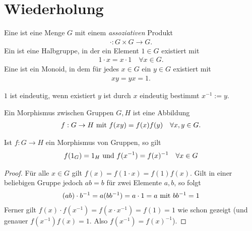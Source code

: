 \section{Wiederholung}
\begin{definition}
	Eine  ist eine Menge $G$ mit einem \emph{assoziativen} Produkt
	\begin{align*}
		\cdot\colon G \times G \to G.
	\end{align*}
	Ein  ist eine Halbgruppe, in der ein Element $1 \in G$ existiert mit 
	\begin{align*}
		1\cdot x = x\cdot 1 \quad\forall x \in G.
	\end{align*}
	Eine  ist ein Monoid, in dem für jedes $x \in G$ ein $y \in G$ existiert mit
	\begin{align*}
		xy = yx = 1.
	\end{align*}
\end{definition}
\begin{remark} %
		$1$ ist eindeutig, wenn existiert $y$ ist durch $x$ eindeutig bestimmt $x^{-1} :=y$. %
\end{remark}
\begin{definition}[Morphismus]
	Ein Morphismus zwischen Gruppen $G,H$ ist eine Abbildung
	\begin{align*}
		f: G \to H \mit f(xy) = f(x)f(y) \quad\forall x,y \in G.
	\end{align*}
\end{definition}
\begin{proposition}
	Ist $f: G \to H$ ein Morphismus von Gruppen, so gilt
	\begin{align*}
		f(1_G) = 1_H \und f(x^{-1}) = f(x)^{-1} \quad \forall x \in G
	\end{align*}
\end{proposition}
\begin{proof}
	Für alle $x \in G$ gilt $f(x) = f(1\cdot x) = f(1)f(x)$. Gilt in einer beliebigen Gruppe jedoch $ab=b$ für zwei Elemente $a,b$, so folgt %
	\begin{align*}
		(ab)\cdot b^{-1} = a(bb^{-1}) = a\cdot 1 = a \mit bb^{-1} = 1
	\end{align*}
	Ferner gilt $f(x)\cdot f(x^{-1}) = f(x \cdot x^{-1}) = f(1) = 1$ wie schon gezeigt (und genauer $f(x^{-1})f(x) = 1$. Also $f(x^{-1}) = f(x)^{-1}$).
\end{proof}
